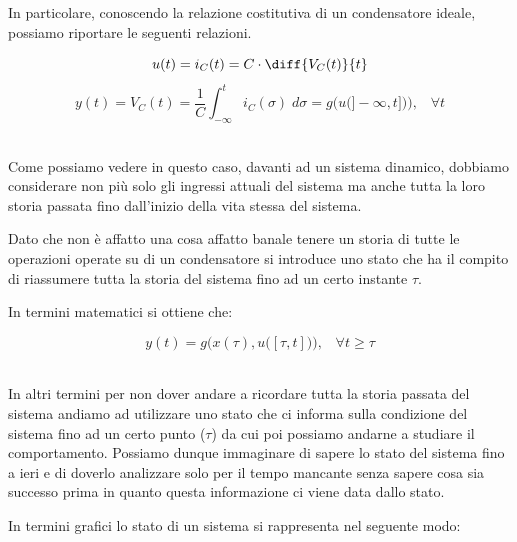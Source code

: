\documentclass[../main.tex]{subfiles}
\begin{document}

In particolare, conoscendo la relazione costitutiva di un condensatore ideale, possiamo riportare le seguenti relazioni.

\[u(t) = i_C(t) = C \cdot \diff{V_C(t)}{t} \]
\[ y(t) = V_C(t) = \frac{1}{C} \int_{-\infty}^t i_C(\sigma)\; d\sigma  = g\big( u\big( ] -\infty, t]\big) \big), \hspace{10pt} \forall t  \]\

Come possiamo vedere in questo caso, davanti ad un sistema dinamico, dobbiamo considerare non più solo gli ingressi attuali del sistema ma anche tutta la loro storia passata fino dall'inizio della vita stessa del sistema.

Dato che non è affatto una cosa affatto banale tenere un storia di tutte le operazioni operate su di un condensatore si introduce uno stato che ha il compito di riassumere tutta la storia del sistema fino ad un certo instante $\tau$. 

In termini matematici si ottiene che:

\[ y(t) = g\big( x(\tau), u\big( [\tau, t]\big) \big), \hspace{10pt} \forall t \geq \tau \]\

In altri termini per non dover andare a ricordare tutta la storia passata del sistema andiamo ad utilizzare uno stato che ci informa sulla condizione del sistema fino ad un certo punto ($\tau$) da cui poi possiamo andarne a studiare il comportamento. Possiamo dunque immaginare di sapere lo stato del sistema fino a ieri e di doverlo analizzare solo per il tempo mancante senza sapere cosa sia successo prima in quanto questa informazione ci viene data dallo stato.

In termini grafici lo stato di un sistema si rappresenta nel seguente modo:\\


\begin{figure}[!ht]
\centering
{}%

\label{fig:my_label}
\end{figure}
\end{document}
